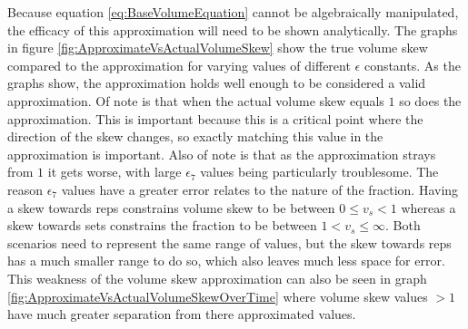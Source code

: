 Because equation \ref{eq:BaseVolumeEquation} cannot be algebraically manipulated, the efficacy of this approximation will need to be shown analytically. The graphs in figure \ref{fig:ApproximateVsActualVolumeSkew} show the true volume skew compared to the approximation for varying values of different $\epsilon$ constants. As the graphs show, the approximation holds well enough to be considered a valid approximation. Of note is that when the actual volume skew equals $1$ so does the approximation. This is important because this is a critical point where the direction of the skew changes, so exactly matching this value in the approximation is important. Also of note is that as the approximation strays from $1$ it gets worse, with large $\epsilon_7$ values being particularly troublesome. The reason $\epsilon_7$ values have a greater error relates to the nature of the fraction. Having a skew towards reps constrains volume skew to be between $0\le v_s<1$ whereas a skew towards sets constrains the fraction to be between $1<v_s\le \infty$. Both scenarios need to represent the same range of values, but the skew towards reps has a much smaller range to do so, which also leaves much less space for error. This weakness of the volume skew approximation can also be seen in graph \ref{fig:ApproximateVsActualVolumeSkewOverTime} where volume skew values $>1$ have much greater separation from there approximated values.


